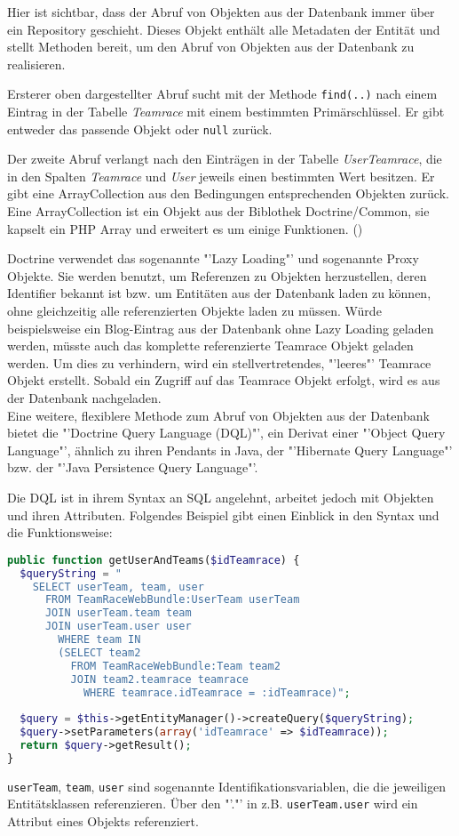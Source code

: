 \documentclass[12pt]{report}
\begin{document}
Hier ist sichtbar, dass der Abruf von Objekten aus der Datenbank immer über ein Repository geschieht. Dieses Objekt enthält alle Metadaten der Entität und stellt Methoden bereit, um den Abruf von Objekten aus der Datenbank zu realisieren.

Ersterer oben dargestellter Abruf sucht mit der Methode \texttt{find(..)} nach einem Eintrag in der Tabelle \emph{Teamrace} mit einem bestimmten Primärschlüssel. Er gibt entweder das passende Objekt oder \texttt{null} zurück.

Der zweite Abruf verlangt nach den Einträgen in der Tabelle \emph{UserTeamrace}, die in den Spalten \emph{Teamrace} und \emph{User} jeweils einen bestimmten Wert besitzen. Er gibt eine ArrayCollection aus den Bedingungen entsprechenden Objekten zurück. Eine ArrayCollection ist ein Objekt aus der Biblothek Doctrine/Common, sie kapselt ein PHP Array und erweitert es um einige Funktionen. (\cite{Doctrine:ArrayCollection})

Doctrine verwendet das sogenannte "'Lazy Loading"' und sogenannte Proxy Objekte. Sie werden benutzt, um Referenzen zu Objekten herzustellen, deren Identifier bekannt ist bzw. um Entitäten aus der Datenbank laden zu können, ohne gleichzeitig alle referenzierten Objekte laden zu müssen. Würde beispielsweise ein Blog-Eintrag aus der Datenbank ohne Lazy Loading geladen werden, müsste auch das komplette referenzierte Teamrace Objekt geladen werden. Um dies zu verhindern, wird ein stellvertretendes, "'leeres"' Teamrace Objekt erstellt. Sobald ein Zugriff auf das Teamrace Objekt erfolgt, wird es aus der Datenbank nachgeladen.\\

Eine weitere, flexiblere Methode zum Abruf von Objekten aus der Datenbank bietet die "'Doctrine Query Language (DQL)"', ein Derivat einer "'Object Query Language"', ähnlich zu ihren Pendants in Java, der "'Hibernate Query Language"' bzw. der "'Java Persistence Query Language"'.

Die DQL ist in ihrem Syntax an SQL angelehnt, arbeitet jedoch mit Objekten und ihren Attributen. Folgendes Beispiel gibt einen Einblick in den Syntax und die Funktionsweise:

\begin{lstlisting}[language=php, caption=Auszug aus src/TeamRace/WebBundle/Entity/UserTeamRepository.php, showstringspaces=false]
public function getUserAndTeams($idTeamrace) {
  $queryString = "
    SELECT userTeam, team, user
      FROM TeamRaceWebBundle:UserTeam userTeam 
      JOIN userTeam.team team
      JOIN userTeam.user user
        WHERE team IN
        (SELECT team2 
          FROM TeamRaceWebBundle:Team team2 
          JOIN team2.teamrace teamrace
            WHERE teamrace.idTeamrace = :idTeamrace)";
		
  $query = $this->getEntityManager()->createQuery($queryString);
  $query->setParameters(array('idTeamrace' => $idTeamrace));		
  return $query->getResult();
}
\end{lstlisting}
\texttt{userTeam}, \texttt{team}, \texttt{user} sind sogenannte Identifikationsvariablen, die die jeweiligen Entitätsklassen referenzieren. Über den "'."' in z.B. \texttt{userTeam.user} wird ein Attribut eines Objekts referenziert.
\end{document}
